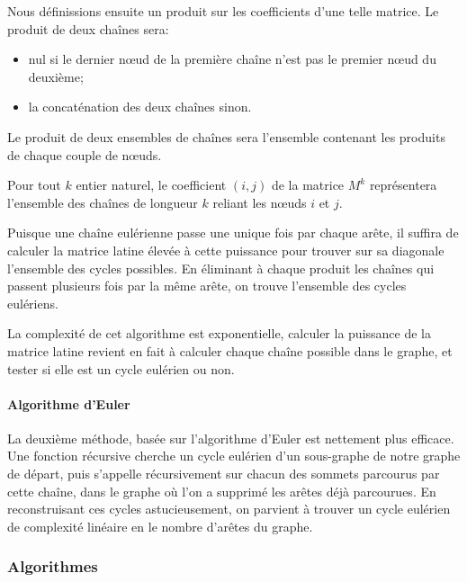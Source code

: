       Nous définissions ensuite un produit sur les coefficients d'une telle
      matrice. Le produit de deux chaînes sera:
      \begin{itemize}
        \item nul si le dernier nœud de la première chaîne n'est pas le premier
          nœud du deuxième;
        \item la concaténation des deux chaînes sinon.
      \end{itemize}

      Le produit de deux ensembles de chaînes sera l'ensemble contenant les
      produits de chaque couple de nœuds.

      Pour tout $k$ entier naturel, le coefficient $(i,j)$ de la matrice $M^k$
      représentera l'ensemble des chaînes de longueur $k$ reliant les nœuds $i$
      et $j$.
      
      Puisque une chaîne eulérienne passe une unique fois par chaque arête, il
      suffira de calculer la matrice latine élevée à cette puissance pour
      trouver sur sa diagonale l'ensemble des cycles possibles. En éliminant à
      chaque produit les chaînes qui passent plusieurs fois par la même arête,
      on trouve l'ensemble des cycles eulériens.

      La complexité de cet algorithme est exponentielle, calculer la puissance
      de la matrice latine revient en fait à calculer chaque chaîne possible dans
      le graphe, et tester si elle est un cycle eulérien ou non.
	
    \paragraph{Algorithme d'Euler}
      La deuxième méthode, basée sur l'algorithme d'Euler est nettement plus
      efficace. Une fonction récursive cherche un cycle eulérien d'un
      sous-graphe de notre graphe de départ, puis s'appelle récursivement sur
      chacun des sommets parcourus par cette chaîne, dans le graphe où l'on a
      supprimé les arêtes déjà parcourues. En reconstruisant ces cycles
      astucieusement, on parvient à trouver un cycle eulérien de complexité
      linéaire en le nombre d'arêtes du graphe. 

  \subsubsection{Algorithmes}
